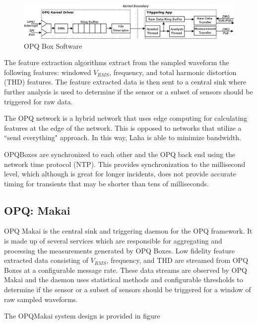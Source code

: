 \begin{figure}
	\centering
	\includegraphics[width=.75\linewidth]{figures/opqbox_software.png}
	\caption{OPQ Box Software}\label{fig:opq-box-software}
\end{figure}

The feature extraction algorithms extract from the sampled waveform the following features: windowed $V_{RMS}$, frequency, and total harmonic distortion (THD) features. The feature extracted data is then sent to a central sink where further analysis is used to determine if the sensor or a subset of sensors should be triggered for raw data.

The OPQ network is a hybrid network that uses edge computing for calculating features at the edge of the network. This is opposed to networks that utilize a ``send everything" approach. In this way, Laha is able to minimize bandwidth. 

OPQBoxes are synchronized to each other and the OPQ back end using the network time protocol (NTP). This provides synchronization to the millisecond level, which although is great for longer incidents, does not provide accurate timing for transients that may be shorter than tens of milliseconds.

\subsection{OPQ: Makai}
OPQ Makai is the central sink and triggering daemon for the OPQ framework. It is made up of several services which are responsible for aggregating and processing the measurements generated by OPQ Boxes. Low fidelity feature extracted data consisting of $V_{RMS}$, frequency, and THD are streamed from OPQ Boxes at a configurable message rate. These data streams are observed by OPQ Makai and the daemon uses statistical methods and configurable thresholds to determine if the sensor or a subset of sensors should be triggered for a window of raw sampled waveforms. 

The OPQMakai system design is provided in figure %


